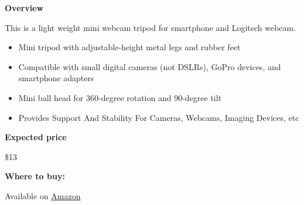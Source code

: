 
\begin{gram}
\label{grm:tas::tripod::mamawin::main}

\textbf{Overview}

This is a light weight mini webcam tripod for smartphone and Logitech webcam.

%
\begin{itemize}
\item
Mini tripod with adjustable-height metal legs and rubber feet

\item
Compatible with small digital cameras (not DSLRs), GoPro devices, and smartphone adapters 

\item
Mini ball head for 360-degree rotation and 90-degree tilt

\item
Provides Support And Stability For Cameras, Webcams, Imaging Devices, etc

\end{itemize}



\textbf{Expected price}

\$13

\textbf{Where to buy:}

Available on
\href{https://www.amazon.com/Lightweight-Webcam-Tripod-Logitech-Camera/dp/B076SHC6RN/ref=sr_1_1_sspa?crid=2T6CQ3HNRR1XR&keywords=logitech+c920&qid=1582900721&s=electronics&sprefix=logitech+c,electronics,172&sr=1-1-spons&psc=1&spLa=ZW5jcnlwdGVkUXVhbGlmaWVyPUE1VjVUUFpKTU83QUkmZW5jcnlwdGVkSWQ9QTA1NTk1OTVLT1IyTzdRRFVEWkImZW5jcnlwdGVkQWRJZD1BMDEyNzk2NzEyTDVSOEdSQ1QxTEgmd2lkZ2V0TmFtZT1zcF9hdGYmYWN0aW9uPWNsaWNrUmVkaXJlY3QmZG9Ob3RMb2dDbGljaz10cnVl}{Amazon}

\end{gram}

